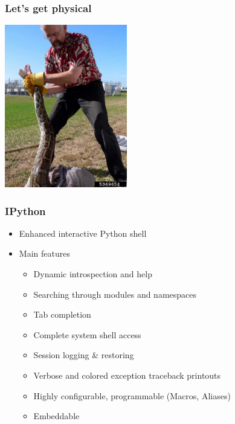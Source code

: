 \documentclass[t,10pt,compress=false,usepdftitle=false]{beamer}
\begin{document}
\begin{frame}[fragile]
    \frametitle{Let's get physical}
    \begin{center}
      \includegraphics[width=0.4\textwidth]{start.jpg}
    \end{center}
\end{frame}

\begin{frame}[fragile]
    \frametitle{IPython}
    \begin{itemize}
        \item Enhanced interactive Python shell
        \item Main features
        \begin{itemize}
            \item Dynamic introspection and help
            \item Searching through modules and namespaces
            \item Tab completion
            \item Complete system shell access
            \item Session logging \& restoring
            \item Verbose and colored exception traceback printouts
            \item Highly configurable, programmable (Macros, Aliases)
            \item Embeddable
        \end{itemize}
    \end{itemize}
\end{frame}
\end{document}
